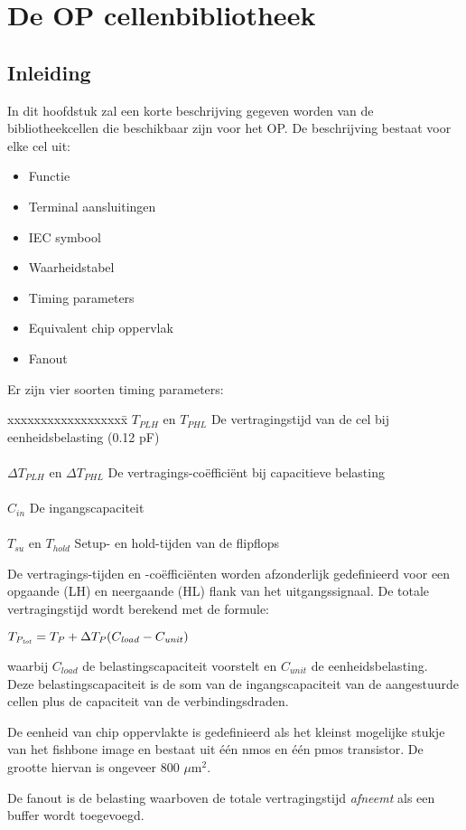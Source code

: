 \section{De OP cellenbibliotheek}

\subsection{Inleiding}

In dit hoofdstuk zal een korte beschrijving gegeven worden van de bibliotheekcellen die beschikbaar zijn voor het OP.
De beschrijving bestaat voor elke cel uit:
\begin{itemize}
\item
Functie
\item
Terminal aansluitingen
\item
IEC symbool
\item
Waarheidstabel
\item
Timing parameters
\item
Equivalent chip oppervlak
\item
Fanout
\end{itemize}

Er zijn vier soorten timing parameters:
\begin{tabbing}
xxxxxxxxxxxxxxxxxx\=\kill
$T_{PLH}$ en $T_{PHL}$\> De vertragingstijd van de cel bij eenheidsbelasting (0.12 pF)\\
\\
${\Delta}T_{PLH}$ en ${\Delta}T_{PHL}$\> De vertragings-co\"effici\"ent bij capacitieve belasting\\
\\
$C_{in}$\> De ingangscapaciteit\\
\\
$T_{su}$ en $T_{hold}$\> Setup- en hold-tijden van de flipflops
\end{tabbing}
De vertragings-tijden en -co\"effici\"enten worden afzonderlijk gedefinieerd voor een opgaande (LH) en neergaande (HL) flank van het uitgangssignaal. 
De totale vertragingstijd wordt berekend met de formule:
\begin{description}
\item
$T_{\it P_{tot}} = T_{\it P} + \Delta T_{\it P}(C_{\it load}-C_{\it unit})$
\end{description}
waarbij $C_{load}$ de belastingscapaciteit voorstelt en $C_{unit}$ de eenheidsbelasting.\\
Deze belastingscapaciteit is de som van de ingangscapaciteit van de aangestuurde cellen plus de capaciteit van de verbindingsdraden.
 
De eenheid van chip oppervlakte is gedefinieerd als het kleinst mogelijke stukje van het fishbone image en bestaat uit \'e\'en nmos en \'e\'en pmos transistor. De grootte hiervan is ongeveer 800 $\mu$m$^{2}$.

De fanout is de belasting waarboven de totale vertragingstijd {\it afneemt} als een buffer wordt toegevoegd.\\

\clearpage


